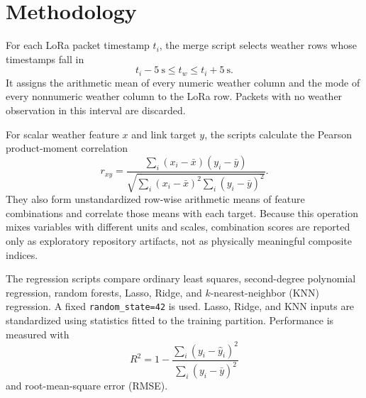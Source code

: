 \section{Methodology}
For each LoRa packet timestamp $t_i$, the merge script selects weather rows whose timestamps fall in
\begin{equation}
 t_i-5~\mathrm{s} \leq t_w \leq t_i+5~\mathrm{s}.
\end{equation}
It assigns the arithmetic mean of every numeric weather column and the mode of every nonnumeric weather column to the LoRa row. Packets with no weather observation in this interval are discarded.

For scalar weather feature $x$ and link target $y$, the scripts calculate the Pearson product-moment correlation
\begin{equation}
r_{xy}=\frac{\sum_i(x_i-\bar{x})(y_i-\bar{y})}
{\sqrt{\sum_i(x_i-\bar{x})^2\sum_i(y_i-\bar{y})^2}}.
\end{equation}
They also form unstandardized row-wise arithmetic means of feature combinations and correlate those means with each target. Because this operation mixes variables with different units and scales, combination scores are reported only as exploratory repository artifacts, not as physically meaningful composite indices.

The regression scripts compare ordinary least squares, second-degree polynomial regression, random forests, Lasso, Ridge, and $k$-nearest-neighbor (KNN) regression. A fixed \texttt{random\_state=42} is used. Lasso, Ridge, and KNN inputs are standardized using statistics fitted to the training partition. Performance is measured with
\begin{equation}
R^2=1-\frac{\sum_i(y_i-\hat y_i)^2}{\sum_i(y_i-\bar y)^2}
\end{equation}
and root-mean-square error (RMSE).
